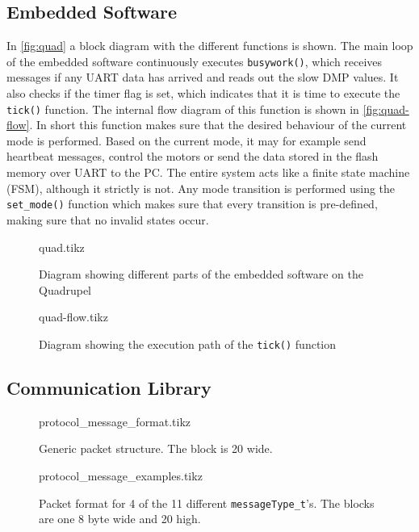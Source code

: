 \documentclass[final]{article}
\begin{document}
\subsection{Embedded Software}
In \autoref{fig:quad} a block diagram with the different functions is shown.
The main loop of the embedded software continuously executes \texttt{busywork()}, which receives messages if any UART data has arrived and reads out the slow DMP values.
It also checks if the timer flag is set, which indicates that it is time to execute the \texttt{tick()} function.
The internal flow diagram of this function is shown in \autoref{fig:quad-flow}.
In short this function makes sure that the desired behaviour of the current mode is performed.
Based on the current mode, it may for example send heartbeat messages, control the motors or send the data stored in the flash memory over UART to the PC.
The entire system acts like a finite state machine (FSM), although it strictly is not.
Any mode transition is performed using the \texttt{set\_mode()} function which makes sure that every transition is pre-defined, making sure that no invalid states occur.

\begin{figure}[H]
\centering
    {quad.tikz}
    \caption{Diagram showing different parts of the embedded software on the Quadrupel}
    \label{fig:quad}
\end{figure}

\begin{figure}[H]
\centering
    {quad-flow.tikz}
    \caption{Diagram showing the execution path of the \texttt{tick()} function}
    \label{fig:quad-flow}
\end{figure}


\subsection{Communication Library}

\begin{figure}[H]
\centering
    {protocol_message_format.tikz}
    \caption{Generic packet structure. The block is \SI{20}{\byte} wide.}
    \label{fig:packet-format}
\end{figure}
\begin{figure}[H]
\centering
    {protocol_message_examples.tikz}
    \caption{Packet format for 4 of the 11 different \texttt{messageType\_t}'s. The blocks are one \SI{8}{\bit} byte wide and \SI{20}{\byte} high.}
    \label{fig:packet-examples}
\end{figure}
\end{document}
